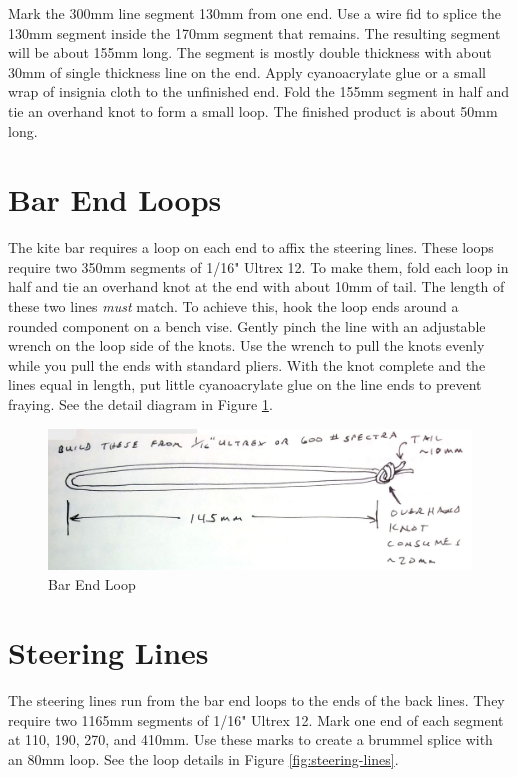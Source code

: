 \documentclass[
]{book}
\begin{document}
Mark the 300mm line segment 130mm from one end. Use a wire fid to splice the 130mm segment inside the 170mm segment that remains. The resulting segment will be about 155mm long. The segment is mostly double thickness with about 30mm of single thickness line on the end. Apply cyanoacrylate glue or a small wrap of insignia cloth to the unfinished end. Fold the 155mm segment in half and tie an overhand knot to form a small loop. The finished product is about 50mm long.

\hypertarget{bar-end-loops}{%
\section{Bar End Loops}\label{bar-end-loops}}

The kite bar requires a loop on each end to affix the steering lines. These loops require two 350mm segments of 1/16" Ultrex 12. To make them, fold each loop in half and tie an overhand knot at the end with about 10mm of tail. The length of these two lines \emph{must} match. To achieve this, hook the loop ends around a rounded component on a bench vise. Gently pinch the line with an adjustable wrench on the loop side of the knots. Use the wrench to pull the knots evenly while you pull the ends with standard pliers. With the knot complete and the lines equal in length, put little cyanoacrylate glue on the line ends to prevent fraying. See the detail diagram in Figure \ref{fig:bar-end-loop}.

\begin{figure}

{\centering \includegraphics[width=0.7\linewidth]{images/05_kite_bar_rigging_2015-10-06_3} 

}

\caption{Bar End Loop}\label{fig:bar-end-loop}
\end{figure}

\hypertarget{steering-lines}{%
\section{Steering Lines}\label{steering-lines}}

The steering lines run from the bar end loops to the ends of the back lines. They require two 1165mm segments of 1/16" Ultrex 12. Mark one end of each segment at 110, 190, 270, and 410mm. Use these marks to create a brummel splice with an 80mm loop. See the loop details in Figure \ref{fig:steering-lines}.
\end{document}
